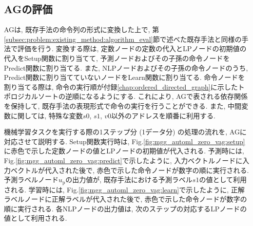 \documentclass[11pt,oneside,openany,report]{jsbook}
\begin{document}
\subsection{AGの評価} \label{subsec:proposed:ag:eval}

AGは, 既存手法の命令列の形式に変換した上で, 第\ref{subsec:problem:existing_method:algorithm_eval}節で述べた既存手法と同様の手法で評価を行う. 変換する際は, 定数ノードの定数の代入とLPノードの初期値の代入をSetup関数に割り当てて, 予測ノードおよびその子孫の命令ノードをPredict関数に割り当てる. また, NLPノードおよびその子孫の命令ノードのうち, Predict関数に割り当てていないノードをLearn関数に割り当てる. 命令ノードを割り当てる際は, 命令の実行順が付録\ref{chap:ordered_directed_graph}に示したトポロジカルソートの逆順になるようにする. これにより, AGで表される依存関係を保持して, 既存手法の表現形式で命令の実行を行うことができる. また, 中間変数に関しては, 特殊な変数$s0$, $s1$, $v0$以外のアドレスを順番に利用する.

機械学習タスクを実行する際の1ステップ分 (1データ分) の処理の流れを, AGに対応させて説明する. Setup関数実行時は, Fig.\ref{fig:mgg_automl_zero_vag:setup}に赤色で示した定数ノードの値とLPノードの初期値が代入される. 予測時には, Fig.\ref{fig:mgg_automl_zero_vag:predict}で示したように, 入力ベクトルノードに入力ベクトルが代入された後で, 赤色で示した命令ノードが数字の順に実行される. 予測ラベルノード$u_\mathrm{p}$の出力値が, 既存手法における予測ラベル$s1$の値として利用される. 学習時には, Fig.\ref{fig:mgg_automl_zero_vag:learn}で示したように, 正解ラベルノードに正解ラベルが代入された後で, 赤色で示した命令ノードが数字の順に実行される. 各NLPノードの出力値は, 次のステップの対応するLPノードの値として利用される.
\end{document}
